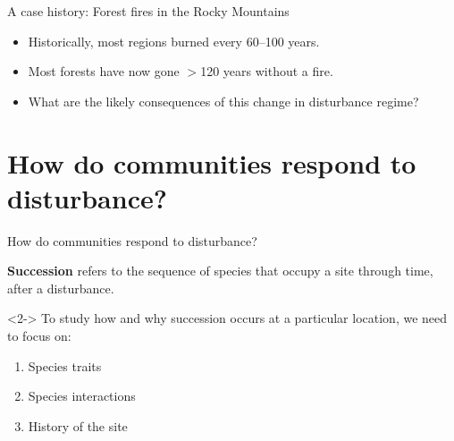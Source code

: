 \begin{frame}[t]
    \begin{adjustwidth}{-2em}{-1.5em}
        A case history: Forest fires in the Rocky Mountains

        \begin{itemize}[<+->]
            \item Historically, most regions burned every 60--100 years.

                \vspace{5mm}
            \item Most forests have now gone $>$120 years without a fire.

                \vspace{5mm}
            \item What are the likely consequences of this change in
                disturbance regime?

        \end{itemize}
    \end{adjustwidth}
\end{frame}

\section{How do communities respond to disturbance?}

\begin{frame}[t]
    \begin{adjustwidth}{-2em}{-1.5em}
        How do communities respond to disturbance?

        \vspace{4mm}
        \textbf{Succession} refers to the sequence of species that occupy a
        site through time, after a disturbance.

        \begin{uncoverenv}<2->
        \vspace{4mm}
        To study how and why succession occurs at a particular location, we
        need to focus on:

        \begin{enumerate}
            \item Species traits
            \item Species interactions
            \item History of the site
        \end{enumerate}
        \end{uncoverenv}
    \end{adjustwidth}
\end{frame}

